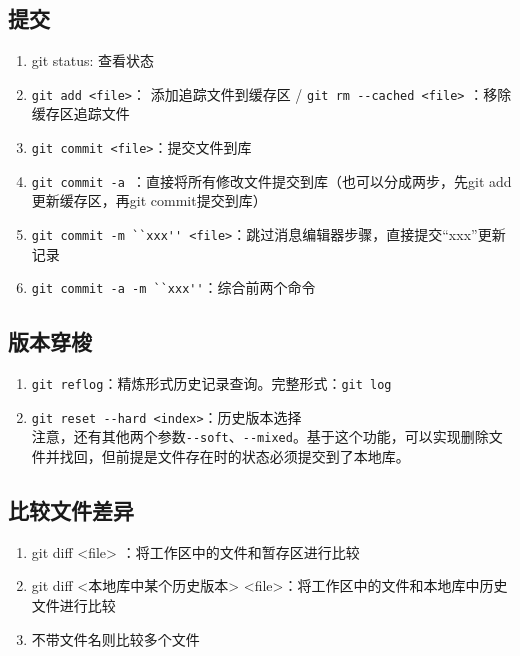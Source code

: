 \subsection{提交}
\begin{enumerate}
\item git status: 查看状态
\item \verb|git add <file>|： 添加追踪文件到缓存区 / \verb|git rm --cached <file>| ：移除缓存区追踪文件
\item \verb|git commit <file>|：提交文件到库
\item \verb|git commit -a |：直接将所有修改文件提交到库（也可以分成两步，先git add更新缓存区，再git commit提交到库）
\item \verb|git commit -m ``xxx'' <file>|：跳过消息编辑器步骤，直接提交“xxx”更新记录
\item \verb|git commit -a -m ``xxx''|：综合前两个命令
\end{enumerate}



\subsection{版本穿梭}
\begin{enumerate}
\item \verb|git reflog|：精炼形式历史记录查询。完整形式：\verb|git log| 

\item \verb|git reset --hard <index>|：历史版本选择\\
注意，还有其他两个参数\verb|--soft|、\verb|--mixed|。基于这个功能，可以实现删除文件并找回，但前提是文件存在时的状态必须提交到了本地库。
\end{enumerate}



\subsection{比较文件差异}
\begin{enumerate}
\item git diff <file> ：将工作区中的文件和暂存区进行比较
\item git diff <本地库中某个历史版本> <file>：将工作区中的文件和本地库中历史文件进行比较
\item 不带文件名则比较多个文件
\end{enumerate}



